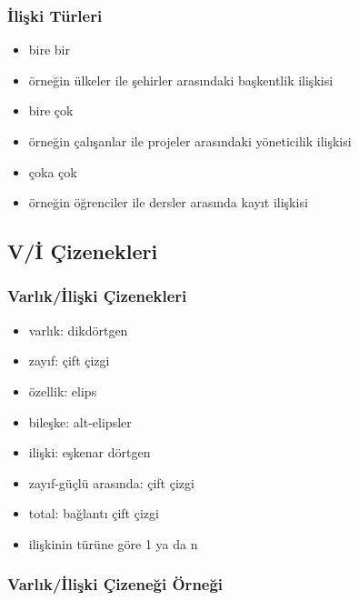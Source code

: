 \documentclass[dvipsnames]{beamer}
\theoremstyle{theorem}
\begin{document}
\begin{frame}
  \frametitle{İlişki Türleri}
  
  \begin{itemize}
    \item \alert{bire bir}
    \item örneğin ülkeler ile şehirler arasındaki başkentlik ilişkisi

    \pause
    \medskip
    \item \alert{bire çok}
    \item örneğin çalışanlar ile projeler arasındaki yöneticilik ilişkisi

    \pause
    \medskip
    \item \alert{çoka çok}
    \item örneğin öğrenciler ile dersler arasında kayıt ilişkisi
  \end{itemize}

\end{frame}



\subsection{V/İ Çizenekleri}

\begin{frame}
  \frametitle{Varlık/İlişki Çizenekleri}
  
  \begin{itemize}
    \item varlık: dikdörtgen
    \item zayıf: çift çizgi

    \pause
    \medskip
    \item özellik: elips
    \item bileşke: alt-elipsler

    \pause
    \medskip
    \item ilişki: eşkenar dörtgen
    \item zayıf-güçlü arasında: çift çizgi
    \item total: bağlantı çift çizgi
    \item ilişkinin türüne göre 1 ya da n
 \end{itemize}
\end{frame}

\begin{frame}
  \frametitle{Varlık/İlişki Çizeneği Örneği}

  \begin{center}
  \end{center}
\end{frame}
\end{document}
